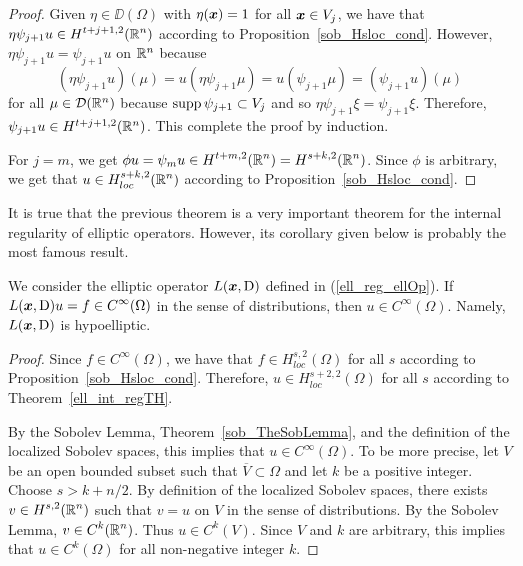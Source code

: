 \begin{proof}
Given $\eta \in \DD(\Omega)$ with $\eta({\bm{x}}) = 1$ for all
${\bm{x}} \in V_j$, we have that
$\displaystyle \eta \psi_{j+1} u \in H^{t+j+1,2}(\mathbb{R}^n)$
according to Proposition~\ref{sob_Hsloc_cond}.  However,
$\eta \psi_{j+1} u = \psi_{j+1} u$ on $\mathbb{R}^n$ because
\[
(\eta \psi_{j+1} u)(\mu) = u\left(\eta \psi_{j+1} \mu\right) =
u\left(\psi_{j+1} \mu\right) = (\psi_{j+1} u)(\mu)
\]
for all $\mu \in \mathcal{D}(\mathbb{R}^n)$ because $\operatorname{supp} \psi_{j+1} \subset V_j$ and
so $\eta \psi_{j+1} \xi = \psi_{j+1} \xi$.
Therefore, $\psi_{j+1} u \in H^{t+j+1,2}(\mathbb{R}^n)$.
This complete the proof by induction.

For $j=m$, we get $\displaystyle \phi u = \psi_m u \in H^{t+m,2}(\mathbb{R}^n)
= H^{s+k,2}(\mathbb{R}^n)$.  Since $\phi$ is arbitrary, we get that
$\displaystyle u \in H^{s+k,2}_{loc}(\mathbb{R}^n)$ according to
Proposition~\ref{sob_Hsloc_cond}.
\end{proof}

It is true that the previous theorem is a very important theorem for
the internal regularity of elliptic operators.  However, its corollary
given below is probably the most famous result.

\begin{cor} \label{ell_Hak_Cinfty}
We consider the elliptic operator $L({\bm{x}},\operatorname{D})$ defined in
(\ref{ell_reg_ellOp}).  If
$\displaystyle L({\bm{x}},\operatorname{D})u = f \in C^\infty(\Omega)$ in
the sense of distributions, then $\displaystyle u \in C^\infty(\Omega)$.
Namely, $L({\bm{x}},\operatorname{D})$ is hypoelliptic.
\end{cor}

\begin{proof}
Since $\displaystyle f \in C^\infty(\Omega)$, we have that
$\displaystyle f \in H^{s,2}_{loc}(\Omega)$
for all $s$ according to Proposition~\ref{sob_Hsloc_cond}.
Therefore, $\displaystyle u \in H^{s+2,2}_{loc}(\Omega)$ for all $s$
according to Theorem~\ref{ell_int_regTH}.

By the Sobolev Lemma, Theorem~\ref{sob_TheSobLemma}, and the
definition of the localized Sobolev spaces, this implies that
$\displaystyle u \in C^\infty(\Omega)$.  To be more precise, let $V$ be an open
bounded subset such that $\overline{V} \subset \Omega$ and let $k$ be
a positive integer.  Choose $s > k + n/2$.
By definition of the localized Sobolev spaces, there exists
$\displaystyle v \in H^{s,2}(\mathbb{R}^n)$ such that $v=u$ on $V$ in the
sense of distributions.  By the Sobolev Lemma,
$\displaystyle v \in C^k(\mathbb{R}^n)$.  Thus
$\displaystyle u \in C^k(V)$.  Since $V$ and $k$
are arbitrary, this implies that $\displaystyle u\in C^k(\Omega)$ for all
non-negative integer $k$.
\end{proof}

